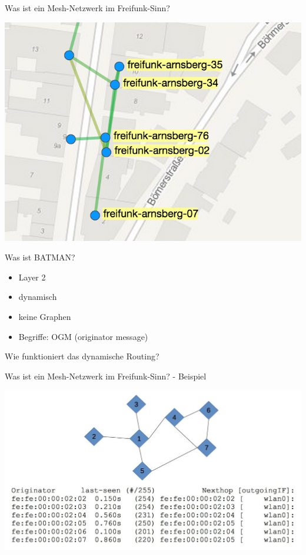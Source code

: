 \documentclass[ngerman,compress,aspectratio=169]{beamer}
\begin{document}
\begin{frame}{Was ist ein Mesh-Netzwerk im Freifunk-Sinn?}
	\begin{center}
		\includegraphics[scale=0.6]{mesh-network-2}
	\end{center}
\end{frame}

\begin{frame}{Was ist BATMAN?}
	\begin{itemize}
	    \pause
		\item Layer 2
	    \pause
		\item dynamisch
	    \pause
		\item keine Graphen
	    \pause
		\item Begriffe: OGM (originator message)
	\end{itemize}
\end{frame}

\begin{frame}
	\begin{center}
		\large{Wie funktioniert das dynamische Routing?}
	\end{center}
\end{frame}

\begin{frame}{Was ist ein Mesh-Netzwerk im Freifunk-Sinn? - Beispiel}
	\begin{center}
		\includegraphics[scale=0.25]{batman-example}
	\end{center}
\end{frame}
\end{document}
